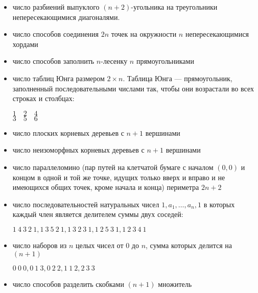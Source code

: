 \begin{itemize}
    \item число разбиений выпуклого $(n + 2)$-угольника на треугольники непересекающимися диагоналями.
    
    \item число способов соединения $2n$ точек на окружности $n$ непересекающимися хордами
    
    \item число способов заполнить $n$-лесенку $n$ прямоугольниками
    
    \item число таблиц Юнга размером $2 \times n$. Таблица Юнга --- прямоугольник, заполненный последовательными числами так, чтобы они возрастали во всех строках и столбцах:
    
    $1 \quad 2 \quad 4$\\
    $3 \quad 5 \quad 6$\\

    \item число плоских корневых деревьев с $n + 1$ вершинами

    \item число неизоморфных корневых деревьев с $n + 1$ вершинами
    
    \item число параллеломино (пар путей на клетчатой бумаге с началом $(0, 0)$ и концом в одной и той же точке, идущих только вверх и вправо и не имеющихся общих точек, кроме начала и конца) периметра $2n + 2$
    
    \item число последовательностей натуральных чисел $1, a_1, \ldots, a_n, 1$ в которых каждый член является делителем суммы двух соседей:
    
    $1~4~3~2~1, 1~3~5~2~1, 1~3~2~3~1, 1~2~5~3~1, 1~2~3~4~1$

    \item число наборов из $n$ целых чисел от $0$ до $n$, сумма которых делится на $(n + 1)$
    
    $0~0~0, 0~1~3, 0~2~2, 1~1~2, 2~3~3$

    \item число способов разделить скобками $(n + 1)$ множитель
\end{itemize}